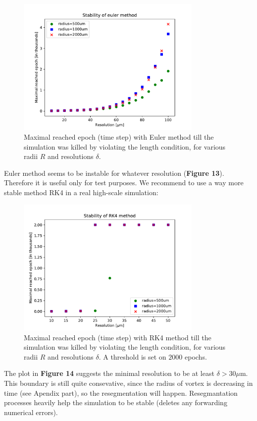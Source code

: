 \begin{figure}[h]
	\centering
	\includegraphics[width=0.8\textwidth]{graphics/results/stability-euler}
	\caption{Maximal reached epoch (time step) with Euler method till the simulation was killed by violating the length condition, for various radii $R$ and resolutions $\delta$.}
\end{figure}


Euler method seems to be instable for whatever resolution (\textbf{Figure 13}). Therefore it is useful only for test purposes. We recommend to use a way more stable method RK4 in a real high-scale simulation:

\begin{figure}[h]
	\centering
	\includegraphics[width=0.8\textwidth]{graphics/results/stability-RK4}
	\caption{Maximal reached epoch (time step) with RK4 method till the simulation was killed by violating the length condition, for various radii $R$ and resolutions $\delta$. A threshold is set on $2000$ epochs.}
\end{figure}

The plot in \textbf{Figure 14} suggests the minimal resolution to be at least $\delta >30\mu\text{m}$. This boundary is still quite consevative, since the radius of vortex is decreasing in time (see Apendix part), so the resegmentation will happen. Resegmantation processes heavily help the simulation to be stable (deletes any forwarding numerical errors).

\newpage
